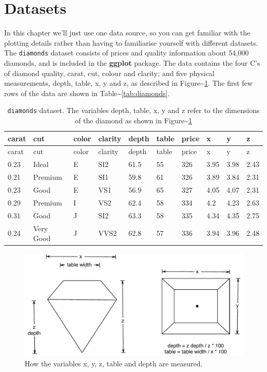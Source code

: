 \section{Datasets}\label{sec:data-sets}

In this chapter we'll just use one data source, so you can get familiar
with the plotting details rather than having to familiarise yourself
with different datasets. The \texttt{diamonds} dataset consists of
prices and quality information about 54,000 diamonds, and is included in
the \textbf{ggplot} package. The data contains the four C's of diamond
quality, carat, cut, colour and clarity; and five physical measurements,
depth, table, x, y and z, as described in
Figure\textasciitilde{}\ref{fig:diamond-dim}. The first few rows of the
data are shown in Table\textasciitilde{}\ref{tab:diamonds}.

\begin{longtable}[c]{@{}llllllllll@{}}
\caption{\texttt{diamonds} dataset. The variables depth, table, x, y and
z refer to the dimensions of the diamond as shown in
Figure\textasciitilde{}\ref{fig:diamond-dim}}\tabularnewline
\toprule
carat & cut & color & clarity & depth & table & price & x & y &
z\tabularnewline
\midrule
\endfirsthead
\toprule
carat & cut & color & clarity & depth & table & price & x & y &
z\tabularnewline
\midrule
\endhead
0.23 & Ideal & E & SI2 & 61.5 & 55 & 326 & 3.95 & 3.98 &
2.43\tabularnewline
0.21 & Premium & E & SI1 & 59.8 & 61 & 326 & 3.89 & 3.84 &
2.31\tabularnewline
0.23 & Good & E & VS1 & 56.9 & 65 & 327 & 4.05 & 4.07 &
2.31\tabularnewline
0.29 & Premium & I & VS2 & 62.4 & 58 & 334 & 4.2 & 4.23 &
2.63\tabularnewline
0.31 & Good & J & SI2 & 63.3 & 58 & 335 & 4.34 & 4.35 &
2.75\tabularnewline
0.24 & Very Good & J & VVS2 & 62.8 & 57 & 336 & 3.94 & 3.96 &
2.48\tabularnewline
\bottomrule
\end{longtable}

\begin{figure}[htbp]
  \centering
    \includegraphics[width=0.8\linewidth]{diagrams/diamond-dimensions}
  \caption{How the variables x, y, z, table and depth are measured.}
  \label{fig:diamond-dim}
\end{figure}

